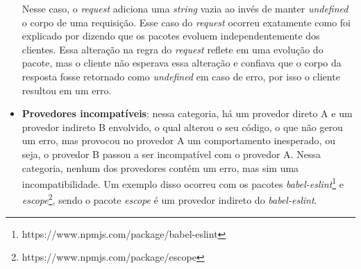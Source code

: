 \begin{itemize}
    Nesse caso, o \textit{request} adiciona uma \textit{string} vazia ao invés de manter \textit{undefined} o corpo de uma requisição. Esse caso do \textit{request} ocorreu exatamente como foi explicado por  dizendo que os pacotes evoluem independentemente dos clientes. Essa alteração na regra do \textit{request} reflete em uma evolução do pacote, mas o cliente não esperava essa alteração e confiava que o corpo da resposta fosse retornado como \textit{undefined} em caso de erro, por isso o cliente resultou em um erro.

    \item \textbf{Provedores incompatíveis}: nessa categoria, há um provedor direto A e um provedor indireto B envolvido, o qual alterou o seu código, o que não gerou um erro, mas provocou no provedor A um comportamento inesperado, ou seja, o provedor B passou a ser incompatível com o provedor A. Nessa categoria, nenhum dos provedores contém um erro, mas sim uma incompatibilidade. Um exemplo disso ocorreu com os pacotes \textit{babel-eslint}\footnote{https://www.npmjs.com/package/babel-eslint} e \textit{escope}\footnote{https://www.npmjs.com/package/escope}, sendo o pacote \textit{escope} é um provedor indireto do \textit{babel-eslint}.


\end{itemize}
